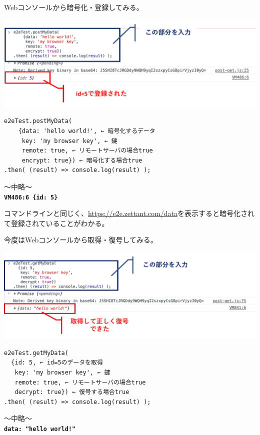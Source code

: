 \documentclass[12pt,dvipdfmx]{beamer}
\begin{document}
\begin{frame}[fragile]
Webコンソールから暗号化・登録してみる。
\begin{center}
\includegraphics[width=0.9\linewidth]{FigsSample01/browser-img2.pdf}
\end{center}

\begin{exampleblock}{}\footnotesize
\begin{verbatim}
e2eTest.postMyData(
    {data: 'hello world!', ← 暗号化するデータ
     key: 'my browser key', ← 鍵
     remote: true, ← リモートサーバの場合true
     encrypt: true}) ← 暗号化する場合true
.then( (result) => console.log(result) );
\end{verbatim}
〜中略〜\\[1ex]
\textbf{\texttt{VM486:6 \{id: 5\}}}
\end{exampleblock}
\end{frame}

\begin{frame}
 コマンドラインと同じく、\url{https://e2e.zettant.com/data}を表示すると暗号化されて登録されていることがわかる。
\end{frame}

\begin{frame}[fragile]
今度はWebコンソールから取得・復号してみる。
\begin{center}
\includegraphics[width=0.9\linewidth]{FigsSample01/browser-img3.pdf}
\end{center}
\begin{exampleblock}{}\footnotesize
\begin{verbatim}
e2eTest.getMyData(
  {id: 5, ← id=5のデータを取得
   key: 'my browser key', ← 鍵
   remote: true, ← リモートサーバの場合true
   decrypt: true}) ← 復号する場合true
.then( (result) => console.log(result) );
\end{verbatim}
〜中略〜\\[1ex]
\textbf{\texttt{{data: "hello world!"}}}
\end{exampleblock}
\end{frame}
\end{document}
